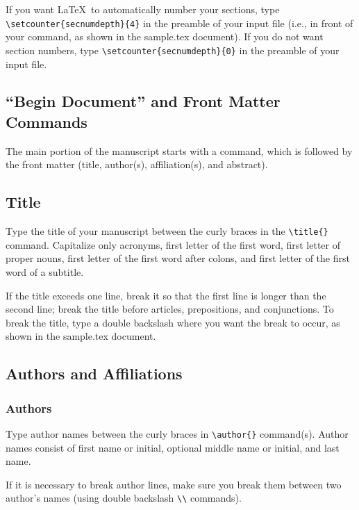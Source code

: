 \begin{article}
If you want \LaTeX\ to automatically number your sections, 
type \verb"\setcounter{secnumdepth}{4}" in the preamble 
of your input file (i.e., in front of your 
\verb"" command, as shown in the 
sample.tex document).  If you do not want section numbers,
type \verb"\setcounter{secnumdepth}{0}" in the \linebreak
preamble of your input file.


\subsection{``Begin Document'' and Front Matter \protect\\
Commands}
  
The main portion of the manuscript starts with a
\verb"" command, which is followed
by the front matter (title, author(s), affiliation(s),
and abstract).


\subsection{Title}

Type the title of your manuscript between the curly 
braces in the \verb"\title{}" command.  Capitalize 
only acronyms, first letter of the first word, first 
letter of proper nouns, first letter of the first word
after colons, and first letter of the first word of a 
subtitle.

If the title exceeds one line, break it so that the 
first line is longer than the second line; break the 
title before articles, prepositions, and conjunctions.
To break the title, type a double backslash where you 
want the break to occur, as shown in the sample.tex 
document.


\subsection{Authors and Affiliations}

\subsubsection{Authors}

Type author names between the curly braces in 
\verb"\author{}" command(s).  Author names consist 
of first name or initial, optional middle name or
initial, and last name.

If it is necessary to break author lines, make sure 
you break them between two author's names (using 
double backslash \verb"\\" commands).



\end{article}
